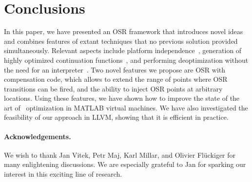 
\section{Conclusions}
\label{se:conclusions}

In this paper, we have presented an OSR framework that introduces novel ideas and combines features of extant techniques that no previous solution provided simultaneously. Relevant aspects include platform independence~\cite{lameed2013modular}, generation of highly optimized continuation functions~\cite{fink2003design}, and performing deoptimization without the need for an interpreter~\cite{bebenita2010spur}. Two novel features we propose are OSR with compensation code, which allows to extend the range of points where OSR transitions can be fired, and the ability to inject OSR points at arbitrary locations. Using these features, we have shown how to improve the state of the art of \feval\ optimization in MATLAB virtual machines. We have also investigated the feasibility of our approach in LLVM, showing that it is efficient in practice.

\ifx\noauthorea\undefined
\paragraph{Acknowledgements.}

We wish to thank Jan Vitek, Petr Maj, Karl Millar, and Olivier Fl{\"u}ckiger for many enlightening discussions. We are especially grateful to Jan for sparking our interest in this exciting line of research. %
\fi
